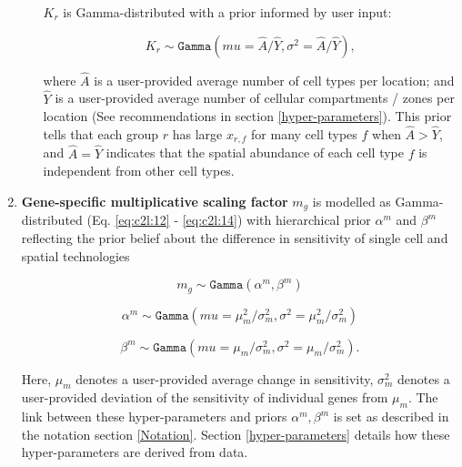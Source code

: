 \documentclass[11pt,a4paper]{article}
\begin{document}
\begin{enumerate}
\begin{itemize}
        $K_r$ is Gamma-distributed with a prior informed by user input:
        \begin{linenomath*} \begin{equation} \label{eq:c2l:11}
        K_r \sim \mathtt{Gamma}(mu =  \hat{A} / \hat{Y}, \sigma^2 = \hat{A} / \hat{Y}),
        \end{equation} \end{linenomath*}
        where $\hat{A}$ is a user-provided average number of cell types per location; and $\hat{Y}$ is a user-provided average number of cellular compartments / zones per location (See recommendations in section \ref{hyper-parameters}). This prior tells that each group $r$ has large $x_{r,f}$ for many cell types $f$ when $\hat{A} > \hat{Y}$, and $\hat{A} = \hat{Y}$ indicates that the spatial abundance of each cell type $f$ is independent from other cell types. 
    
        \end{itemize}
    
    \item \textbf{Gene-specific multiplicative scaling factor} $m_{g}$ is modelled as Gamma-distributed (Eq. \eqref{eq:c2l:12} - \eqref{eq:c2l:14}) with hierarchical prior $\alpha^m$ and $\beta^m$ reflecting the prior belief about the difference in sensitivity of single cell and spatial technologies
    \begin{linenomath*} \begin{equation} \label{eq:c2l:12}
    m_{g} \sim \mathtt{Gamma}(\alpha^m, \beta^m) 
    \end{equation} \end{linenomath*}
    \begin{linenomath*} \begin{equation} \label{eq:c2l:13}
    \alpha^m \sim \mathtt{Gamma}(mu = \mu_m^2 / \sigma_m^2, \sigma^2 = \mu_m^2 / \sigma_m^2)
    \end{equation} \end{linenomath*}
    \begin{linenomath*} \begin{equation} \label{eq:c2l:14}
    \beta^m \sim \mathtt{Gamma}(mu = \mu_m / \sigma_m^2, \sigma^2 =\mu_m / \sigma_m^2).
    \end{equation} \end{linenomath*}
    
    Here, $\mu_m$ denotes a user-provided average change in sensitivity, $\sigma_m^2$ denotes a user-provided deviation of the sensitivity of individual genes from $\mu_m$. The link between these hyper-parameters and priors $\alpha^m, \beta^m$ is set as described in the notation section \ref{Notation}. Section \ref{hyper-parameters} details how these hyper-parameters are derived from data.
    

\end{enumerate}
\end{document}
